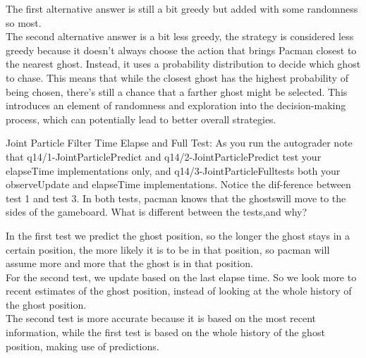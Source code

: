 \documentclass[12pt]{article}
\newenvironment{Question}[2][Question]{\begin{trivlist}
\item[\hskip \labelsep {\bfseries #1}\hskip \labelsep {\bfseries #2.}]}{\end{trivlist}}
\begin{document}
The first alternative answer is still a bit greedy but added with some randomness so most.\\
The second alternative answer is a bit less greedy, the strategy is considered less greedy because it doesn't always choose the action that brings Pacman closest to the nearest ghost.
Instead, it uses a probability distribution to decide which ghost to chase.
This means that while the closest ghost has the highest probability of being chosen, there's still a chance that a farther ghost might be selected.
This introduces an element of randomness and exploration into the decision-making process, which can potentially lead to better overall strategies.
\begin{Question}{4}
 Joint Particle Filter Time Elapse and Full Test: As you run the autograder note that q14/1-JointParticlePredict and q14/2-JointParticlePredict test your elapseTime implementations only, and q14/3-JointParticleFulltests both your observeUpdate and elapseTime implementations.
 Notice the dif-ference between test 1 and test 3.
 In both tests, pacman knows that the ghostswill move to the sides of the gameboard.
 What is different between the tests,and why?
\end{Question}
In the first test we predict the ghost position, so the longer the ghost stays in a certain position, the more likely it is to be in that position, so pacman will assume more and more that the ghost is in that position.\\
For the second test, we update based on the last elapse time.
So we look more to recent estimates of the ghost position, instead of looking at the whole history of the ghost position.\\
The second test is more accurate because it is based on the most recent information, while the first test is based on the whole history of the ghost position, making use of predictions.
\end{document}
